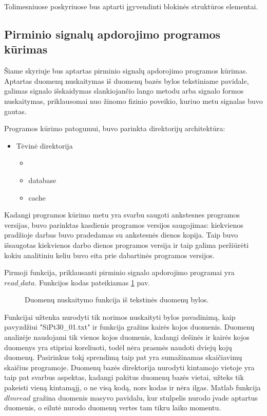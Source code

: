 \documentclass[10pt,onecolumn,draftcls]{IEEEtran}
\begin{document}
Tolimesniuose poskyriuose bus aptarti įgyvendinti blokinės struktūros elementai.

\subsection{Pirminio signalų apdorojimo programos kūrimas}

Šiame skyriuje bus aptartas pirminio signalų apdorojimo programos
kūrimas. Aptartas duomenų nuskaitymas iš duomenų bazės bylos
tekstiniame pavidale, galimas signalo išskaidymas slankiojančio lango
metodu arba signalo formos nuskaitymas, priklausomai nuo žinomo
fizinio poveikio, kuriuo metu signalas buvo gautas.

Programos kūrimo patogumui, buvo parinkta direktorijų architektūra:

\begin{itemize}
\item Tėvinė direktorija
  \begin{itemize}
  \item <programos versija, nurodyta datos formatu>
  \item database
  \item cache
  \end{itemize}
\end{itemize}

Kadangi programos kūrimo metu yra svarbu saugoti ankstesnes programos
versijas, buvo parinktas kasdienis programos versijos saugojimas:
kiekvienos pradžioje darbas buvo pradedamas su ankstesnės dienos
kopija. Taip buvo išsaugotas kiekvienos darbo dienos programos versija
ir taip galima peržiūrėti kokiu analitiniu keliu buvo eita prie
dabartinės programos versijos.

Pirmoji funkcija, priklausanti pirminio signalo apdorojimo programai
yra $read\_data$. Funkcijos kodas pateikiamas \ref{code:read_data} pav.

\begin{figure}[t]
  \centering
  
  \caption{Duomenų nuskaitymo funkcija iš tekstinės duomenų bylos.}
  \label{code:read_data}
\end{figure}

Funkcijai užtenka nurodyti tik norimos nuskaityti bylos pavadinimą,
kaip pavyzdžiui "SiPt30\_01.txt" ir funkcija gražins kairės kojos
duomenis. Duomenų analizėje naudojami tik vienos kojos duomenis,
kadangi dešinės ir kairės kojos duomenys yra stipriai koreliuoti, %
todėl nėra prasmės naudoti dviejų kojų duomenų. Pasirinkus tokį
sprendimą taip pat yra sumažinamas skaičiavimų skaičius
programoje. Duomenų bazės direktorija nurodyti kintamojo vietoje yra
taip pat svarbus aspektas, kadangi pakitus duomenų bazės vietai,
užteks tik pakeisti vieną kintamąjį, o ne visą kodą, nors kodas ir
nėra ilgas. Matlab funkcija $dlmread$ gražina duomenis masyvo
pavidalu, kur stulpelis nurodo įvade aptartus duomenis, o eilutė
nurodo duomenų vertes tam tikru laiko momentu.
\end{document}

